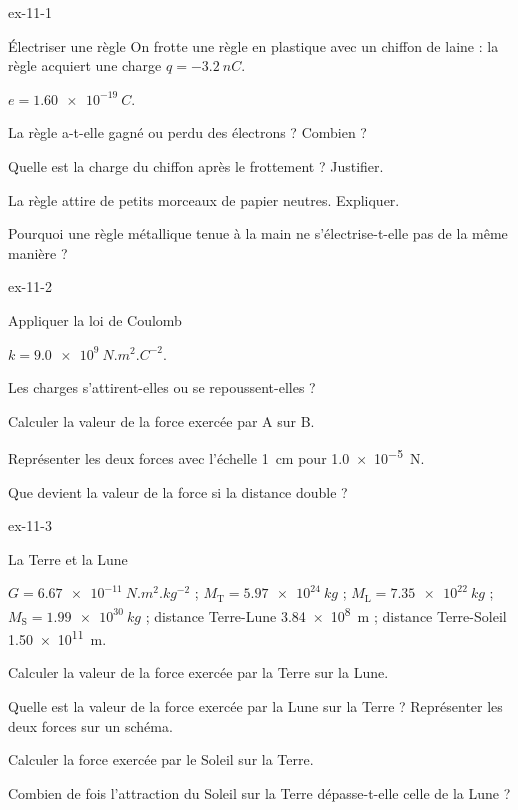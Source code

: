 \begin{blocLivre}{ex-11-1}
\begin{exercice}[1]{Électriser une règle}
On frotte une règle en plastique avec un chiffon de laine : la règle acquiert une charge $q=\qty{-3,2}{nC}$.
\begin{donnees}
$e=\qty{1,60e-19}{C}$.
\end{donnees}
\begin{questions}
\item La règle a-t-elle gagné ou perdu des électrons ? Combien ?
\item Quelle est la charge du chiffon après le frottement ? Justifier.
\item La règle attire de petits morceaux de papier neutres. Expliquer.
\item Pourquoi une règle métallique tenue à la main ne s'électrise-t-elle pas de la même manière ?
\end{questions}
\end{exercice}
\end{blocLivre}
\begin{blocLivre}{ex-11-2}
\begin{exercice}[1]{Appliquer la loi de Coulomb}
\begin{donnees}
$k=\qty{9,0e9}{N.m^2.C^{-2}}$.
\end{donnees}
\begin{questions}
\item Les charges s'attirent-elles ou se repoussent-elles ?
\item Calculer la valeur de la force exercée par A sur B.
\item Représenter les deux forces avec l'échelle \qty{1}{cm} pour \qty{1,0e-5}{N}.
\item Que devient la valeur de la force si la distance double ?
\end{questions}
\end{exercice}
\end{blocLivre}
\begin{blocLivre}{ex-11-3}
\begin{exercice}[1]{La Terre et la Lune}
\begin{donnees}
$G=\qty{6,67e-11}{N.m^2.kg^{-2}}$ ; $M_\mathrm{T}=\qty{5,97e24}{kg}$ ; $M_\mathrm{L}=\qty{7,35e22}{kg}$ ; $M_\mathrm{S}=\qty{1,99e30}{kg}$ ; distance Terre-Lune \qty{3,84e8}{m} ;
distance Terre-Soleil \qty{1,50e11}{m}.
\end{donnees}
\begin{questions}
\item Calculer la valeur de la force exercée par la Terre sur la Lune.
\item Quelle est la valeur de la force exercée par la Lune sur la Terre ? Représenter les deux forces sur un schéma.
\item Calculer la force exercée par le Soleil sur la Terre.
\item Combien de fois l'attraction du Soleil sur la Terre dépasse-t-elle celle de la Lune ?
\end{questions}
\end{exercice}
\end{blocLivre}
